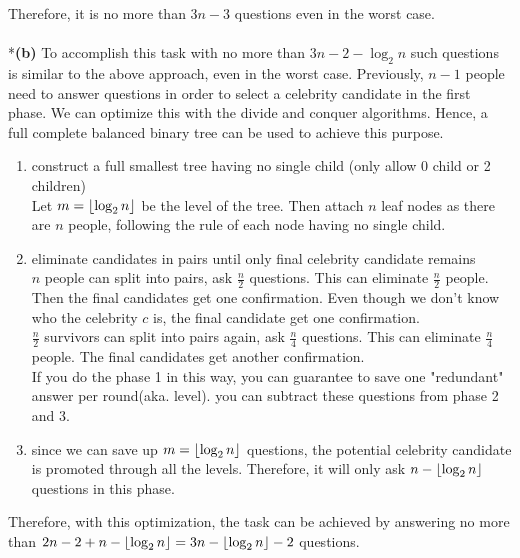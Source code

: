 \documentclass[a4paper]{scrartcl}
\begin{document}
Therefore, it is no more than $3n-3$ questions even in the worst case.
\\
\\*{\bfseries(b)} To accomplish this task with no more than $3n-2-\log_2{n}$ such questions is similar to the above approach, even in the worst case. Previously, $n-1$ people need to answer questions in order to select a celebrity candidate in the first phase. We can optimize this with the divide and conquer algorithms. Hence, a full complete balanced binary tree can be used to  achieve this purpose.
\begin{enumerate}
  \item construct a full smallest tree having no single child (only allow 0 child or 2 children)\\
  Let $m =\left\lfloor \log_2{n} \right\rfloor$ be the level of the tree. Then attach $n$ leaf nodes as there are $n$ people, following the rule of each node having no single child.
  \item eliminate candidates in pairs until only final celebrity candidate remains\\
  $n$ people can split into pairs, ask $\frac{n}{2}$ questions. This can eliminate $\frac{n}{2}$ people. Then the final candidates get one confirmation. Even though we don't know who the celebrity $c$ is, the final candidate get one confirmation.\\ 
  $\frac{n}{2}$ survivors can split into pairs again, ask $\frac{n}{4}$ questions. This can eliminate $\frac{n}{4}$ people. The final candidates get another confirmation.\\
  If you do the phase 1 in this way, you can guarantee to save one "redundant" answer per round(aka. level). you can subtract these questions from phase 2 and 3.
  \item since we can save up $m=\left\lfloor \log_2{n} \right\rfloor$ questions, the potential celebrity candidate is promoted through all the levels. Therefore, it will only ask $n-\left\lfloor \log_2{n} \right\rfloor$ questions in this phase.
\end{enumerate}
Therefore, with this optimization, the task can be achieved by answering no more than $2n-2+n-\left\lfloor \log_2{n} \right\rfloor=3n-\left\lfloor \log_2{n} \right\rfloor-2$ questions.
\end{document}
